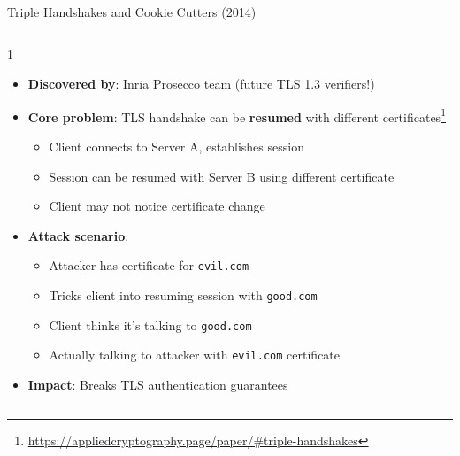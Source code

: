 \ifdefined\PRESENTATION\else\PassOptionsToClass{handout}{beamer}\fi\documentclass[aspectratio=169, lualatex]{beamer}
\begin{document}
\begin{frame}{Triple Handshakes and Cookie Cutters (2014)}
	\begin{columns}[c]
		\begin{column}{1\textwidth}
			\begin{itemize}
				\item \textbf{Discovered by}: Inria Prosecco team (future TLS 1.3 verifiers!)
				\item \textbf{Core problem}: TLS handshake can be \textbf{resumed} with different certificates\footnote{\url{https://appliedcryptography.page/paper/\#triple-handshakes}}
				      \begin{itemize}
					      \item Client connects to Server A, establishes session
					      \item Session can be resumed with Server B using different certificate
					      \item Client may not notice certificate change
				      \end{itemize}
				\item \textbf{Attack scenario}:
				      \begin{itemize}
					      \item Attacker has certificate for \texttt{evil.com}
					      \item Tricks client into resuming session with \texttt{good.com}
					      \item Client thinks it's talking to \texttt{good.com}
					      \item Actually talking to attacker with \texttt{evil.com} certificate
				      \end{itemize}
				\item \textbf{Impact}: Breaks TLS authentication guarantees
			\end{itemize}
		\end{column}
	\end{columns}
\end{frame}
\end{document}
